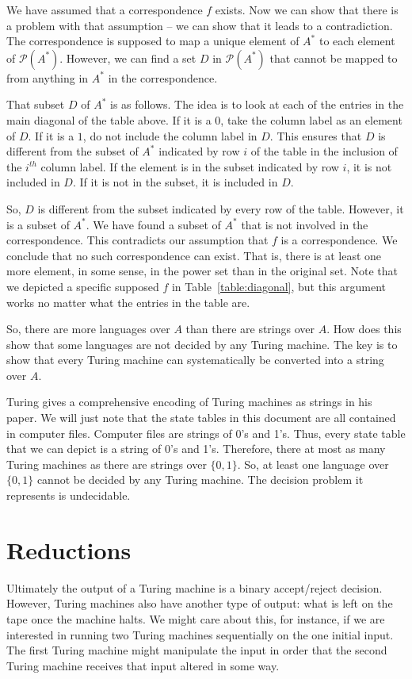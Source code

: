 \documentclass{iansnotes}
\begin{document}
  We have assumed that a correspondence $f$ exists.
  Now we can show that there is a problem with that assumption -- we can show that it leads to a contradiction.
  The correspondence is supposed to map a unique element of $A^*$ to each element of $\mathcal{P}(A^*)$.
  However, we can find a set $D$ in $\mathcal{P}(A^*)$ that cannot be mapped to from anything in $A^*$ in the correspondence.
  
  That subset $D$ of $A^*$ is as follows.
  The idea is to look at each of the entries in the main diagonal of the table above.
  If it is a $0$, take the column label as an element of $D$.
  If it is a $1$, do not include the column label in $D$.
  This ensures that $D$ is different from the subset of $A^*$ indicated by row $i$ of the table in the inclusion of the $i^{th}$ column label.
  If the element is in the subset indicated by row $i$, it is not included in $D$.
  If it is not in the subset, it is included in $D$.
  
  So, $D$ is different from the subset indicated by every row of the table.
  However, it is a subset of $A^*$.
  We have found a subset of $A^*$ that is not involved in the correspondence.
  This contradicts our assumption that $f$ is a correspondence.
  We conclude that no such correspondence can exist.
  That is, there is at least one more element, in some sense, in the power set than in the original set.
  Note that we depicted a specific supposed $f$ in Table~\ref{table:diagonal}, but this argument works no matter what the entries in the table are.

  So, there are more languages over $A$ than there are strings over $A$.
  How does this show that some languages are not decided by any Turing machine.
  The key is to show that every Turing machine can systematically be converted into a string over $A$.

  Turing gives a comprehensive encoding of Turing machines as strings in his paper.
  We will just note that the state tables in this document are all contained in computer files.
  Computer files are strings of 0's and 1's.
  Thus, every state table that we can depict is a string of 0's and 1's.
  Therefore, there at most as many Turing machines as there are strings over $\{0,1\}$.
  So, at least one language over $\{0,1\}$ cannot be decided by any Turing machine.
  The decision problem it represents is undecidable.



\section{Reductions}
  Ultimately the output of a Turing machine is a binary accept/reject decision.
  However, Turing machines also have another type of output: what is left on the tape once the machine halts.
  We might care about this, for instance, if we are interested in running two Turing machines sequentially on the one initial input.
  The first Turing machine might manipulate the input in order that the second Turing machine receives that input altered in some way.
\end{document}

